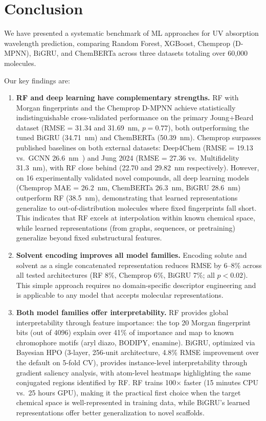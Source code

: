 \documentclass[journal=jcisd8,manuscript=article]{achemso}
\begin{document}
\section{Conclusion}
\label{sec:conclusion}

We have presented a systematic benchmark of ML approaches for UV absorption wavelength prediction, comparing Random Forest, XGBoost, Chemprop (D-MPNN), BiGRU, and ChemBERTa across three datasets totaling over 60,000 molecules.

Our key findings are:

\begin{enumerate}
    \item \textbf{RF and deep learning have complementary strengths.}
    RF with Morgan fingerprints and the Chemprop D-MPNN achieve statistically indistinguishable cross-validated performance on the primary Joung+Beard dataset (RMSE = 31.34 and 31.69~nm, $p = 0.77$), both outperforming the tuned BiGRU (34.71~nm) and ChemBERTa (50.39~nm). Chemprop surpasses published baselines on both external datasets: Deep4Chem (RMSE = 19.13 vs.\ GCNN 26.6~nm~\cite{joung2021deep}) and Jung 2024 (RMSE = 27.36 vs.\ Multifidelity 31.3~nm), with RF close behind (22.70 and 29.82~nm respectively).
    However, on 16 experimentally validated novel compounds, all deep learning models (Chemprop MAE = 26.2~nm, ChemBERTa 26.3~nm, BiGRU 28.6~nm) outperform RF (38.5~nm), demonstrating that learned representations generalize to out-of-distribution molecules where fixed fingerprints fall short.
    This indicates that RF excels at interpolation within known chemical space, while learned representations (from graphs, sequences, or pretraining) generalize beyond fixed substructural features.

    \item \textbf{Solvent encoding improves all model families.}
    Encoding solute and solvent as a single concatenated representation reduces RMSE by 6--8\% across all tested architectures (RF 8\%, Chemprop 6\%, BiGRU 7\%; all $p < 0.02$).
    This simple approach requires no domain-specific descriptor engineering and is applicable to any model that accepts molecular representations.

    \item \textbf{Both model families offer interpretability.}
    RF provides global interpretability through feature importance: the top 20 Morgan fingerprint bits (out of 4096) explain over 41\% of importance and map to known chromophore motifs (aryl diazo, BODIPY, enamine).
    BiGRU, optimized via Bayesian HPO (3-layer, 256-unit architecture, 4.8\% RMSE improvement over the default on 5-fold CV), provides instance-level interpretability through gradient saliency analysis, with atom-level heatmaps highlighting the same conjugated regions identified by RF.
    RF trains 100$\times$ faster (15 minutes CPU vs.\ 25 hours GPU), making it the practical first choice when the target chemical space is well-represented in training data, while BiGRU's learned representations offer better generalization to novel scaffolds.


\end{enumerate}
\end{document}
